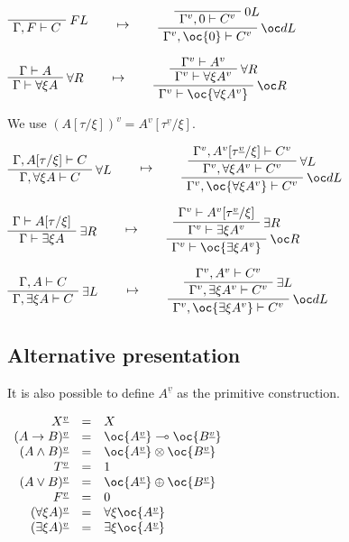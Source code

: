 \(\LabelRule{F L}
\NulRule{\Gamma,F\vdash C}
\DisplayProof
\qquad\mapsto\qquad
\LabelRule{\zero L}
\NulRule{\Gamma^v,\zero\vdash C^v}
\LabelRule{\oc d L}
\UnaRule{\Gamma^v,\oc{\zero}\vdash C^v}
\DisplayProof\)

\(\AxRule{\Gamma\vdash A}
\LabelRule{\forall R}
\UnaRule{\Gamma\vdash \forall\xi A}
\DisplayProof
\qquad\mapsto\qquad
\AxRule{\Gamma^v\vdash A^v}
\LabelRule{\forall R}
\UnaRule{\Gamma^v\vdash \forall\xi A^v}
\LabelRule{\oc R}
\UnaRule{\Gamma^v\vdash \oc{\forall\xi A^v}}
\DisplayProof\)

We use \((A[\tau/\xi])^v=A^v[\tau^{\underline{v}}/\xi]\).

\(\AxRule{\Gamma,A[\tau/\xi]\vdash C}
\LabelRule{\forall L}
\UnaRule{\Gamma,\forall\xi A\vdash C}
\DisplayProof
\qquad\mapsto\qquad
\AxRule{\Gamma^v,A^v[\tau^{\underline{v}}/\xi]\vdash C^v}
\LabelRule{\forall L}
\UnaRule{\Gamma^v,\forall\xi A^v\vdash C^v}
\LabelRule{\oc d L}
\UnaRule{\Gamma^v,\oc{\forall\xi A^v}\vdash C^v}
\DisplayProof\)

\(\AxRule{\Gamma\vdash A[\tau/\xi]}
\LabelRule{\exists R}
\UnaRule{\Gamma\vdash \exists\xi A}
\DisplayProof
\qquad\mapsto\qquad
\AxRule{\Gamma^v\vdash A^v[\tau^{\underline{v}}/\xi]}
\LabelRule{\exists R}
\UnaRule{\Gamma^v\vdash \exists\xi A^v}
\LabelRule{\oc R}
\UnaRule{\Gamma^v\vdash \oc{\exists\xi A^v}}
\DisplayProof\)

\(\AxRule{\Gamma,A\vdash C}
\LabelRule{\exists L}
\UnaRule{\Gamma,\exists\xi A\vdash C}
\DisplayProof
\qquad\mapsto\qquad
\AxRule{\Gamma^v,A^v\vdash C^v}
\LabelRule{\exists L}
\UnaRule{\Gamma^v,\exists\xi A^v\vdash C^v}
\LabelRule{\oc d L}
\UnaRule{\Gamma^v,\oc{\exists\xi A^v}\vdash C^v}
\DisplayProof\)

\subsection{Alternative
presentation}\label{alternative-presentation-2}

It is also possible to define \(A^{\underline{v}}\) as the primitive
construction.

\(\begin{array}{rcl}
X^{\underline{v}} &  = &  X \\
(A\imp B)^{\underline{v}} &  = &  \oc{A^{\underline{v}}}\limp\oc{B^{\underline{v}}} \\
(A\wedge B)^{\underline{v}} &  = &  \oc{A^{\underline{v}}}\tens\oc{B^{\underline{v}}} \\
T^{\underline{v}} &  = &  \one \\
(A\vee B)^{\underline{v}} &  = &  \oc{A^{\underline{v}}}\plus\oc{B^{\underline{v}}} \\
F^{\underline{v}} &  = &  \zero \\
(\forall\xi A)^{\underline{v}} &  = &  \forall\xi \oc{A^{\underline{v}}} \\
(\exists\xi A)^{\underline{v}} &  = &  \exists\xi \oc{A^{\underline{v}}}
\end{array}\)

